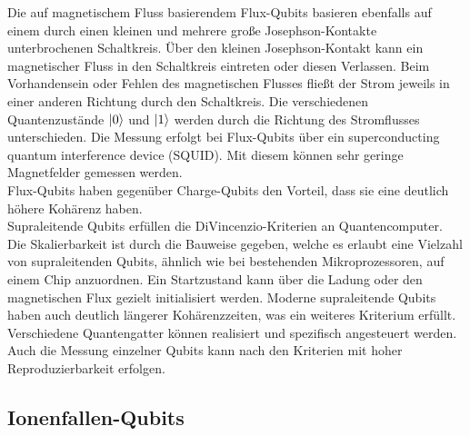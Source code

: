 Die auf magnetischem Fluss basierendem Flux-Qubits basieren ebenfalls auf einem durch einen kleinen und mehrere große Josephson-Kontakte unterbrochenen Schaltkreis.
Über den kleinen Josephson-Kontakt kann ein magnetischer Fluss in den Schaltkreis eintreten oder diesen Verlassen. Beim Vorhandensein oder Fehlen des magnetischen Flusses fließt der Strom jeweils in einer anderen Richtung durch den Schaltkreis. Die verschiedenen Quantenzustände $\ket0$ und $\ket1$ werden durch die Richtung des Stromflusses unterschieden. Die Messung erfolgt bei Flux-Qubits über ein superconducting quantum interference device (SQUID). Mit diesem können sehr geringe Magnetfelder gemessen werden.\\
Flux-Qubits haben gegenüber Charge-Qubits den Vorteil, dass sie eine deutlich höhere Kohärenz haben.\\

Supraleitende Qubits erfüllen die DiVincenzio-Kriterien an Quantencomputer. Die Skalierbarkeit ist durch die Bauweise gegeben, welche es erlaubt eine Vielzahl von supraleitenden Qubits, ähnlich wie bei bestehenden Mikroprozessoren, auf einem Chip anzuordnen. Ein Startzustand kann über die Ladung oder den magnetischen Flux gezielt initialisiert werden. Moderne supraleitende Qubits haben auch deutlich längerer Kohärenzzeiten, was ein weiteres Kriterium erfüllt. Verschiedene Quantengatter können realisiert und spezifisch angesteuert werden. Auch die Messung einzelner Qubits kann nach den Kriterien mit hoher Reproduzierbarkeit erfolgen.\\

\subsection{Ionenfallen-Qubits }
\label{subsec: Ionenfallen}

